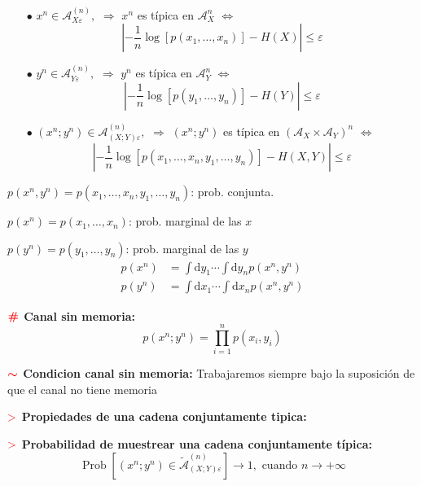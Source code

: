 \documentclass[%
 reprint,
 amsmath,amssymb,
 aps,
]{revtex4-1}
\begin{document}
\begin{itemize}
  \item[$\bullet$] $x^{n} \in \mathcal{A}_{X \varepsilon}^{(n)},$ $\Rightarrow$ $x^{n}$ es típica en $\mathcal{A}_{X}^{n}$ $\Leftrightarrow$
  $$
  \left|-\frac{1}{n} \log \left[p\left(x_{1}, \ldots, x_{n}\right)\right]-H(X)\right| \leq \varepsilon
  $$
  \item[$\bullet$] $y^{n} \in \mathcal{A}_{Y \varepsilon}^{(n)},$ $\Rightarrow$ $y^{n}$ es típica en $\mathcal{A}_{Y}^{n}$ $\Leftrightarrow$
  $$
  \left|-\frac{1}{n} \log \left[p\left(y_{1}, \ldots, y_{n}\right)\right]-H(Y)\right| \leq \varepsilon
  $$
  \item[$\bullet$] $\left(x^{n} ; y^{n}\right) \in \mathcal{A}_{(X ; Y) \varepsilon}^{(n)},$ $\Rightarrow$ $\left(x^{n} ; y^{n}\right)$ es típica en $\left(\mathcal{A}_{X} \times \mathcal{A}_{Y}\right)^{n}$  $\Leftrightarrow$
  $$
  \left|-\frac{1}{n} \log \left[p\left(x_{1}, \ldots, x_{n}, y_{1}, \ldots, y_{n}\right)\right]-H(X, Y)\right| \leq \varepsilon
  $$
  
\end{itemize}

$p\left(x^{n}, y^{n}\right)=p\left(x_{1}, \ldots, x_{n}, y_{1}, \ldots, y_{n}\right)$: prob. conjunta.

$p\left(x^{n}\right)=p\left(x_{1}, \ldots, x_{n}\right)$: prob. marginal de las $x$

$p\left(y^{n}\right)=p\left(y_{1}, \ldots, y_{n}\right)$: prob. marginal de las $y$
$$
\begin{aligned}
p\left(x^{n}\right) &=\int \mathrm{d} y_{1} \cdots \int \mathrm{d} y_{n} p\left(x^{n}, y^{n}\right) \\
p\left(y^{n}\right) &=\int \mathrm{d} x_{1} \cdots \int \mathrm{d} x_{n} p\left(x^{n}, y^{n}\right)
\end{aligned}
$$

\textbf{$\color{red}{\textbf{\#}}$ Canal sin memoria:}
$$
p\left(x^{n} ; y^{n}\right)=\prod_{i=1}^{n} p\left(x_{i}, y_{i}\right)
$$

\textbf{$\textcolor{red}{\color{red}{\boldsymbol{\sim}}}$ Condicion canal sin memoria:} 
Trabajaremos siempre bajo la suposición de que el canal no tiene memoria

\textbf{$\textcolor{red}{\mathbf{>}}$ Propiedades de una cadena conjuntamente tipica:}

\textbf{$\textcolor{red}{\mathbf{>}}$ Probabilidad de muestrear una cadena conjuntamente típica:}
$$
\operatorname{Prob}\left[\left(x^{n} ; y^{n}\right) \in \tilde{\mathcal{A}}_{(X ; Y) \varepsilon}^{(n)}\right] \rightarrow 1, \text { cuando } n \rightarrow+\infty
$$
\end{document}
